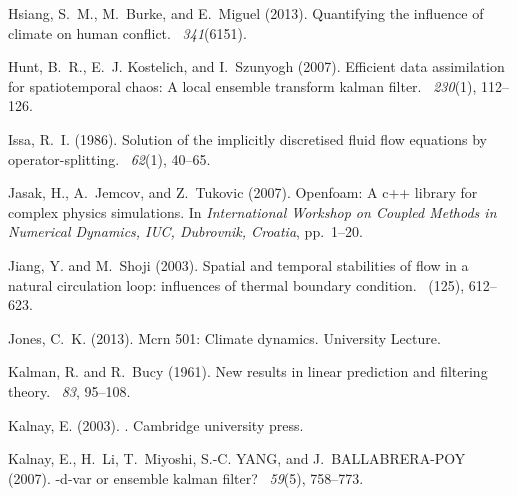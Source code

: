 \documentclass[12pt]{report}
\begin{document}
\begin{thebibliography}{}
Hsiang, S.~M., M.~Burke, and E.~Miguel (2013).
\newblock Quantifying the influence of climate on human conflict.
~{\em 341\/}(6151).

Hunt, B.~R., E.~J. Kostelich, and I.~Szunyogh (2007).
\newblock Efficient data assimilation for spatiotemporal chaos: A local
  ensemble transform kalman filter.
~{\em 230\/}(1), 112--126.

Issa, R.~I. (1986).
\newblock Solution of the implicitly discretised fluid flow equations by
  operator-splitting.
~{\em 62\/}(1), 40--65.

Jasak, H., A.~Jemcov, and Z.~Tukovic (2007).
\newblock Openfoam: A c++ library for complex physics simulations.
\newblock In {\em International Workshop on Coupled Methods in Numerical
  Dynamics, IUC, Dubrovnik, Croatia}, pp.\  1--20.

Jiang, Y. and M.~Shoji (2003).
\newblock Spatial and temporal stabilities of flow in a natural circulation
  loop: influences of thermal boundary condition.
~(125), 612--623.

Jones, C.~K. (2013).
\newblock Mcrn 501: Climate dynamics.
\newblock University Lecture.

Kalman, R. and R.~Bucy (1961).
\newblock New results in linear prediction and filtering theory.
~{\em 83}, 95--108.

Kalnay, E. (2003).
.
\newblock Cambridge university press.

Kalnay, E., H.~Li, T.~Miyoshi, S.-C. YANG, and J.~BALLABRERA-POY (2007).
-d-var or ensemble kalman filter?
~{\em 59\/}(5), 758--773.


\end{thebibliography}
\end{document}
